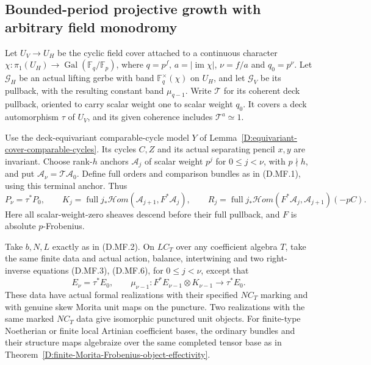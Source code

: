 \subsection{Bounded-period projective growth with arbitrary field monodromy}

\begin{lemma}
\label{D:skew-Morita-Frobenius-effectivity}
Let $U_V\to U_H$ be the cyclic field cover attached to a
continuous character
$\chi:\pi_1(U_H)\to\operatorname{Gal}(\mathbb F_q/\mathbb F_p)$,
where $q=p^f$, $a=|\operatorname{im}\chi|$, $\nu=f/a$ and
$q_0=p^\nu$. Let $\mathcal G_H$ be an actual lifting gerbe
with band $\mathbb F_q^\times(\chi)$ on $U_H$, and let
$\mathcal G_V$ be its pullback, with the resulting constant
band $\mu_{q-1}$. Write $\mathscr T$ for its coherent deck
pullback, oriented to carry scalar weight one to scalar
weight $q_0$. It covers a deck automorphism $\tau$ of $U_V$,
and its given coherence includes $\mathscr T^a\simeq1$.

Use the deck-equivariant comparable-cycle model $Y$ of
Lemma~\ref{D:equivariant-cover-comparable-cycles}. Its cycles
$C,Z$ and its actual separating pencil $x,y$ are invariant.
Choose rank-$h$ anchors $\mathcal A_j$ of scalar weight $p^j$
for $0\le j<\nu$, with $p\nmid h$, and put
$\mathcal A_\nu=\mathscr T\mathcal A_0$. Define full orders
and comparison bundles as in (D.MF.1), using this terminal
anchor. Thus
\[
 P_\nu=\tau^*P_0,\qquad
 K_j=\operatorname{full}j_*\mathcal Hom
              (\mathcal A_{j+1},F^*\mathcal A_j),\qquad
 R_j=\operatorname{full}j_*\mathcal Hom
              (F^*\mathcal A_j,\mathcal A_{j+1})(-pC).
                                                        \tag{D.SM.1}
\]
Here all scalar-weight-zero sheaves descend before their
full pullback, and $F$ is absolute $p$-Frobenius.

Take $b,N,L$ exactly as in (D.MF.2). On $LC_T$ over any
coefficient algebra $T$, take the same finite data and
actual action, balance, intertwining and two right-inverse
equations (D.MF.3), (D.MF.6), for $0\le j<\nu$, except that
\[
             E_\nu=\tau^*E_0,\qquad
 \mu_{\nu-1}:F^*E_{\nu-1}\otimes K_{\nu-1}
                                     \longrightarrow\tau^*E_0 .
                                                        \tag{D.SM.2}
\]
These data have actual formal realizations with their
specified $NC_T$ marking and with genuine skew Morita
unit maps on the puncture. Two realizations with the same
marked $NC_T$ data give isomorphic punctured unit objects.
For finite-type Noetherian or finite local Artinian
coefficient bases, the ordinary bundles and their structure
maps algebraize over the same completed tensor base as in
Theorem~\ref{D:finite-Morita-Frobenius-object-effectivity}.


\end{lemma}
